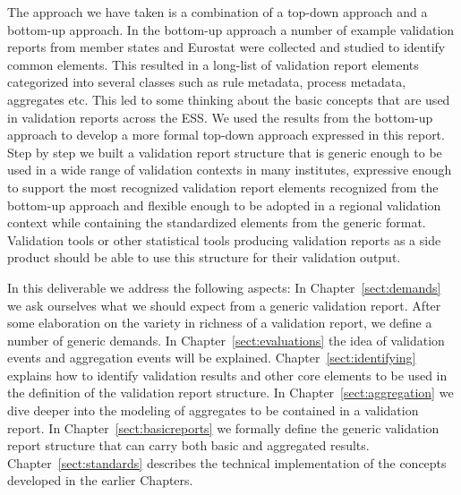 The approach we have taken is a combination of a top-down approach and a
bottom-up approach.  In the bottom-up approach a number of example validation
reports from member states and Eurostat were collected and studied to identify
common elements.  This resulted in a long-list of validation report elements
categorized into several classes such as rule metadata, process metadata,
aggregates etc.  This led to some thinking about the basic concepts that are
used in validation reports across the ESS.  We used the results from the
bottom-up approach to develop a more formal top-down approach expressed in this
report.  Step by step we built a validation report structure that is generic
enough to be used in a wide range of validation contexts in many institutes,
expressive enough to support the most recognized validation report elements
recognized from the bottom-up approach and flexible enough to be adopted in a
regional validation context while containing the standardized elements from the
generic format.  Validation tools or other statistical tools producing
validation reports as a side product should be able to use this structure for
their validation output.

In this deliverable we address the following aspects: In
Chapter~\ref{sect:demands} we ask ourselves what we should expect from a
generic validation report.  After some elaboration on the variety in richness
of a validation report, we define a number of generic demands. In
Chapter~\ref{sect:evaluations} the idea of validation events and 
aggregation events will be explained.
Chapter~\ref{sect:identifying} explains how to identify validation results
and other core elements to be used in the
definition of the validation report structure.
In Chapter~\ref{sect:aggregation} we dive deeper into the modeling of aggregates
to be contained in a validation report.
In Chapter~\ref{sect:basicreports} we formally define the generic validation report 
structure that can carry both basic and aggregated results.
Chapter~\ref{sect:standards} describes the technical implementation of the
concepts developed in the earlier Chapters.  


